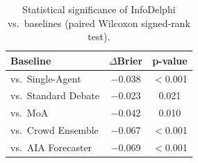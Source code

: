\documentclass[11pt]{article}
\theoremstyle{plain}
\theoremstyle{definition}
\begin{document}
\begin{table}[t]
\centering
\caption{Statistical significance of InfoDelphi vs.\ baselines (paired Wilcoxon signed-rank test).}
\label{tab:significance}
\small
\begin{tabular}{lcc}
\toprule
\textbf{Baseline} & $\Delta$\textbf{Brier} & \textbf{p-value} \\
\midrule
vs.\ Single-Agent & $-$0.038 & $<$0.001 \\
vs.\ Standard Debate & $-$0.023 & 0.021 \\
vs.\ MoA & $-$0.042 & 0.010 \\
vs.\ Crowd Ensemble & $-$0.067 & $<$0.001 \\
vs.\ AIA Forecaster & $-$0.069 & $<$0.001 \\
\bottomrule
\end{tabular}
\vspace{-1em}
\end{table}


\end{document}
